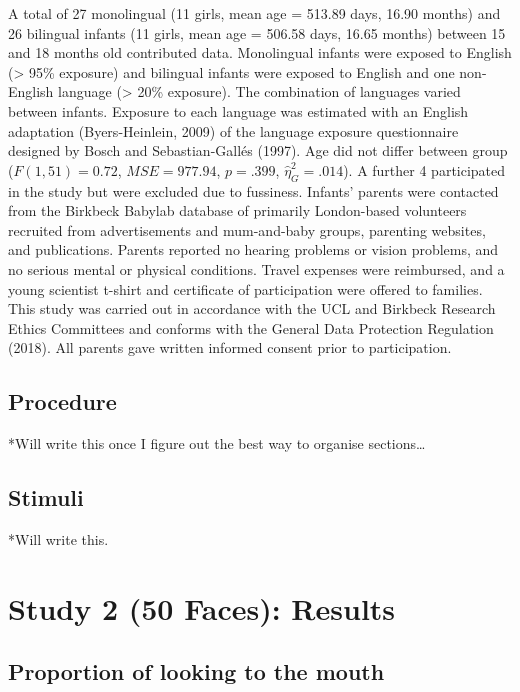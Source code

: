 \documentclass[english,man,floatsintext]{apa6}
\begin{document}
A total of 27 monolingual (11 girls, mean age = 513.89 days, 16.90 months) and 26 bilingual infants (11 girls, mean age = 506.58 days, 16.65 months) between 15 and 18 months old contributed data. Monolingual infants were exposed to English (\textgreater{} 95\% exposure) and bilingual infants were exposed to English and one non-English language (\textgreater{} 20\% exposure). The combination of languages varied between infants. Exposure to each language was estimated with an English adaptation (Byers-Heinlein, 2009) of the language exposure questionnaire designed by Bosch and Sebastian-Gallés (1997). Age did not differ between group (\(F(1, 51) = 0.72\), \(\mathit{MSE} = 977.94\), \(p = .399\), \(\hat{\eta}^2_G = .014\)). A further 4 participated in the study but were excluded due to fussiness.
Infants' parents were contacted from the Birkbeck Babylab database of primarily London-based volunteers recruited from advertisements and mum-and-baby groups, parenting websites, and publications. Parents reported no hearing problems or vision problems, and no serious mental or physical conditions. Travel expenses were reimbursed, and a young scientist t-shirt and certificate of participation were offered to families.
This study was carried out in accordance with the UCL and Birkbeck Research Ethics Committees and conforms with the General Data Protection Regulation (2018). All parents gave written informed consent prior to participation.

\hypertarget{procedure-1}{%
\subsection{Procedure}\label{procedure-1}}

*Will write this once I figure out the best way to organise sections\ldots{}

\hypertarget{stimuli-1}{%
\subsection{Stimuli}\label{stimuli-1}}

*Will write this.

\hypertarget{study-2-50-faces-results}{%
\section{Study 2 (50 Faces): Results}\label{study-2-50-faces-results}}

\hypertarget{proportion-of-looking-to-the-mouth}{%
\subsection{Proportion of looking to the mouth}\label{proportion-of-looking-to-the-mouth}}
\end{document}
